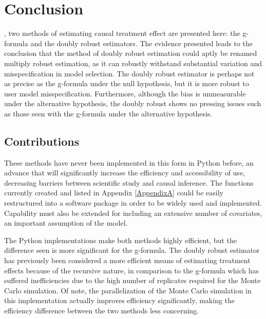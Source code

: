 \chapter{Conclusion}
\label{conclusion}


, two methods of estimating causal treatment effect are presented here: the g-formula and the doubly robust estimators.  The evidence presented leads to the conclusion that the method of doubly robust estimation could aptly be renamed multiply robust estimation, as it can robustly withstand substantial variation and misspecification in model selection.  The doubly robust estimator is perhaps not as precise as the g-formula under the null hypothesis, but it is more robust to user model misspecification.  Furthermore, although the bias is unmeasurable under the alternative hypothesis, the doubly robust shows no pressing issues such as those seen with the g-formula under the alternative hypothesis.  

\section{Contributions}
These methods have never been implemented in this form in Python before, an advance that will significantly increase the efficiency and accessibility of use, decreasing barriers between scientific study and causal inference.  The functions currently created and listed in Appendix \ref{AppendixA} could be easily restructured into a software package in order to be widely used and implemented.  Capability must also be extended for including an extensive number of covariates, an important assumption of the model.  

The Python implementations make both methods highly efficient, but the difference seen is more significant for the g-formula.  The doubly robust estimator has previously been considered a more efficient means of estimating treatment effects because of the recursive nature, in comparison to the g-formula which has suffered inefficiencies due to the high number of replicates required for the Monte Carlo simulation.  Of note, the parallelization of the Monte Carlo simulation in this implementation actually improves efficiency significantly, making the efficiency difference between the two methods less concerning.  

